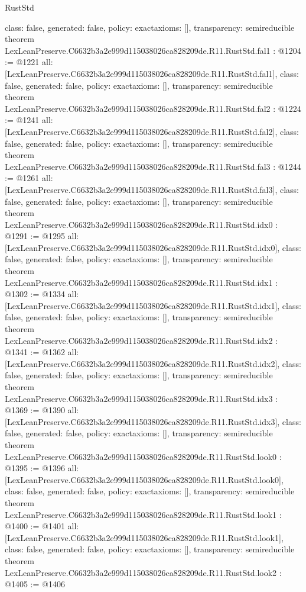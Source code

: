 \begin{lexlean}{RustStd}
\begin{coremodule}
{  class: false,
  generated: false,
  policy: exact{axioms: []},
  transparency: semireducible
}
theorem LexLeanPreserve.C6632b3a2e999d115038026ca828209de.R11.RustStd.fal1 : @1204 := @1221 {
  all: [LexLeanPreserve.C6632b3a2e999d115038026ca828209de.R11.RustStd.fal1],
  class: false,
  generated: false,
  policy: exact{axioms: []},
  transparency: semireducible
}
theorem LexLeanPreserve.C6632b3a2e999d115038026ca828209de.R11.RustStd.fal2 : @1224 := @1241 {
  all: [LexLeanPreserve.C6632b3a2e999d115038026ca828209de.R11.RustStd.fal2],
  class: false,
  generated: false,
  policy: exact{axioms: []},
  transparency: semireducible
}
theorem LexLeanPreserve.C6632b3a2e999d115038026ca828209de.R11.RustStd.fal3 : @1244 := @1261 {
  all: [LexLeanPreserve.C6632b3a2e999d115038026ca828209de.R11.RustStd.fal3],
  class: false,
  generated: false,
  policy: exact{axioms: []},
  transparency: semireducible
}
theorem LexLeanPreserve.C6632b3a2e999d115038026ca828209de.R11.RustStd.idx0 : @1291 := @1295 {
  all: [LexLeanPreserve.C6632b3a2e999d115038026ca828209de.R11.RustStd.idx0],
  class: false,
  generated: false,
  policy: exact{axioms: []},
  transparency: semireducible
}
theorem LexLeanPreserve.C6632b3a2e999d115038026ca828209de.R11.RustStd.idx1 : @1302 := @1334 {
  all: [LexLeanPreserve.C6632b3a2e999d115038026ca828209de.R11.RustStd.idx1],
  class: false,
  generated: false,
  policy: exact{axioms: []},
  transparency: semireducible
}
theorem LexLeanPreserve.C6632b3a2e999d115038026ca828209de.R11.RustStd.idx2 : @1341 := @1362 {
  all: [LexLeanPreserve.C6632b3a2e999d115038026ca828209de.R11.RustStd.idx2],
  class: false,
  generated: false,
  policy: exact{axioms: []},
  transparency: semireducible
}
theorem LexLeanPreserve.C6632b3a2e999d115038026ca828209de.R11.RustStd.idx3 : @1369 := @1390 {
  all: [LexLeanPreserve.C6632b3a2e999d115038026ca828209de.R11.RustStd.idx3],
  class: false,
  generated: false,
  policy: exact{axioms: []},
  transparency: semireducible
}
theorem LexLeanPreserve.C6632b3a2e999d115038026ca828209de.R11.RustStd.look0 : @1395 := @1396 {
  all: [LexLeanPreserve.C6632b3a2e999d115038026ca828209de.R11.RustStd.look0],
  class: false,
  generated: false,
  policy: exact{axioms: []},
  transparency: semireducible
}
theorem LexLeanPreserve.C6632b3a2e999d115038026ca828209de.R11.RustStd.look1 : @1400 := @1401 {
  all: [LexLeanPreserve.C6632b3a2e999d115038026ca828209de.R11.RustStd.look1],
  class: false,
  generated: false,
  policy: exact{axioms: []},
  transparency: semireducible
}
theorem LexLeanPreserve.C6632b3a2e999d115038026ca828209de.R11.RustStd.look2 : @1405 := @1406 {
}
\end{coremodule}
\end{lexlean}

